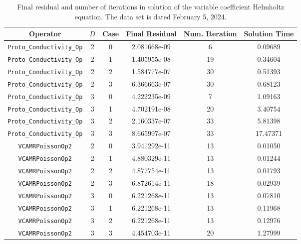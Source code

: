\documentclass{article}
\begin{document}
\begin{small}
\begin{table}
\begin{center}
\begin{tabular}{|c|c|c|c|c||c|} \hline
 Operator                   & $D$ & Case & Final Residual &
 Num. Iteration & Solution Time\\
\hline
 {\tt Proto\_Conductivity\_Op}    & 2   & 0    & 2.081668e-09   &         6  & 0.09689 \\
 {\tt Proto\_Conductivity\_Op}    & 2   & 1    & 1.405955e-08   &         19 & 0.34604 \\
 {\tt Proto\_Conductivity\_Op}    & 2   & 2    & 1.584777e-07   &         30 & 0.51393 \\
 {\tt Proto\_Conductivity\_Op}    & 2   & 3    & 6.366663e-07   &         30 & 0.68123 \\
 {\tt Proto\_Conductivity\_Op}    & 3   & 0    & 4.222235e-09   &         7  & 1.09163 \\
 {\tt Proto\_Conductivity\_Op}    & 3   & 1    & 4.702191e-08   &         20 & 3.40754 \\
 {\tt Proto\_Conductivity\_Op}    & 3   & 2    & 2.160337e-07   &         33 & 5.81398 \\
 {\tt Proto\_Conductivity\_Op}    & 3   & 3    & 8.665997e-07   &         33 & 17.47371\\
\hline                                                                        
 {\tt VCAMRPoissonOp2}            & 2   & 0    & 3.941292e-11   &         13 & 0.01050\\
 {\tt VCAMRPoissonOp2}            & 2   & 1    & 4.880329e-11   &         13 & 0.01244\\
 {\tt VCAMRPoissonOp2}            & 2   & 2    & 4.877754e-11   &         13 & 0.01793\\
 {\tt VCAMRPoissonOp2}            & 2   & 3    & 6.872614e-11   &         18 & 0.02939\\
 {\tt VCAMRPoissonOp2}            & 3   & 0    & 6.221268e-11   &         13 & 0.07810\\
 {\tt VCAMRPoissonOp2}            & 3   & 1    & 6.221268e-11   &         13 & 0.11968\\
 {\tt VCAMRPoissonOp2}            & 3   & 2    & 6.221268e-11   &         13 & 0.12976\\
 {\tt VCAMRPoissonOp2}            & 3   & 3    & 4.454703e-11   &         20 & 1.27999\\
\hline
\end{tabular}
\end{center}
\label{tab::conductivity1}
\caption
    {
      Final residual and number of iterations in solution of the variable
      coefficient Helmholtz equation.
      The data set is dated February 5, 2024.
    }
\end{table}
\end{small}
\end{document}

